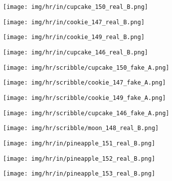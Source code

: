 \documentclass[10pt,twocolumn,letterpaper]{article}
\begin{document}
\begin{figure*}[tbp]
\captionsetup[subfigure]{labelformat=empty}
\begin{center}
  \begin{subfigure}[b]{\hrwidth\linewidth}
  \texttt{[image: img/hr/in/cupcake\_150\_real\_B.png]}
  \end{subfigure}
  \begin{subfigure}[b]{\hrwidth\linewidth}
  \texttt{[image: img/hr/in/cookie\_147\_real\_B.png]}
  \end{subfigure}
\begin{subfigure}[b]{\hrwidth\linewidth}
  \texttt{[image: img/hr/in/cookie\_149\_real\_B.png]}
  \end{subfigure}
  \begin{subfigure}[b]{\hrwidth\linewidth}
  \texttt{[image: img/hr/in/cupcake\_146\_real\_B.png]}
  \end{subfigure}

  \begin{subfigure}[b]{\hrwidth\linewidth}
  \texttt{[image: img/hr/scribble/cupcake\_150\_fake\_A.png]}
  \end{subfigure}
  \begin{subfigure}[b]{\hrwidth\linewidth}
  \texttt{[image: img/hr/scribble/cookie\_147\_fake\_A.png]}
  \end{subfigure}
\begin{subfigure}[b]{\hrwidth\linewidth}
  \texttt{[image: img/hr/scribble/cookie\_149\_fake\_A.png]}
  \end{subfigure}
  \begin{subfigure}[b]{\hrwidth\linewidth}
  \texttt{[image: img/hr/scribble/cupcake\_146\_fake\_A.png]}
  \end{subfigure}


\begin{subfigure}[b]{\hrwidth\linewidth}
  \texttt{[image: img/hr/scribble/moon\_148\_real\_B.png]}
  \end{subfigure}
  \begin{subfigure}[b]{\hrwidth\linewidth}
  \texttt{[image: img/hr/in/pineapple\_151\_real\_B.png]}
  \end{subfigure}
\begin{subfigure}[b]{\hrwidth\linewidth}
  \texttt{[image: img/hr/in/pineapple\_152\_real\_B.png]}
  \end{subfigure}
  \begin{subfigure}[b]{\hrwidth\linewidth}
  \texttt{[image: img/hr/in/pineapple\_153\_real\_B.png]}
  \end{subfigure}  


\end{center}
\end{figure*}
\end{document}
